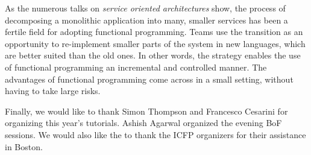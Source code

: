 \documentclass{jfp1}
\begin{document}
As the numerous talks on \textit{service oriented architectures} show, the
process of decomposing a monolithic application into many, smaller services
has been a fertile field for adopting functional programming. Teams use the
transition as an opportunity to re-implement smaller parts of the system in
new languages, which are better suited than the old ones. In other words,
the strategy enables the use of functional programming an incremental and
controlled manner. The advantages of functional programming come across in
a small setting, without having to take large risks.

Finally, we would like to thank Simon Thompson and Francesco Cesarini for
organizing this year's tutorials. Ashish Agarwal organized the evening BoF
sessions. We would also like the to thank the ICFP organizers for their
assistance in Boston. 


\end{document}
